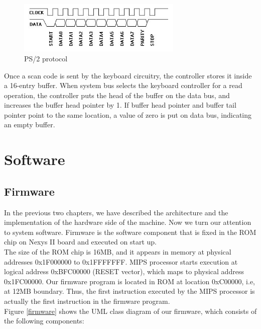 \documentclass[oneside]{book}
\begin{document}
\begin{figure}[H]
\begin{center}
\includegraphics[width=0.7\textwidth]{ps2prot.png}
\end{center}
\caption{PS/2 protocol}
\label{ps2prot}
\end{figure}

Once a scan code is sent by the keyboard circuitry, the controller stores
it inside a 16-entry buffer. When system bus selects the keyboard controller
for a read operation, the controller puts the head of the buffer on
the data bus, and increases the buffer head pointer by 1. If buffer head
pointer and buffer tail pointer point to the same location, a value
of zero is put on data bus, indicating an empty buffer.


\chapter{Software}

\section{Firmware}

In the previous two chapters, we have described the architecture and the
implementation of the hardware side of the machine. Now we turn our
attention to system software. Firmware is the software component that
is fixed in the ROM chip on Nexys II board and executed on start up.\\

The size of the ROM chip is 16MB, and it appears in memory at physical
addresses 0x1F000000 to 0x1FFFFFFF. MIPS processor starts execution
at logical address 0xBFC00000 (RESET vector), which maps to physical
address 0x1FC00000. Our firmware program is located in ROM at
location 0xC00000, i.e, at 12MB boundary. Thus, the first instruction executed
by the MIPS processor is actually the first instruction in the firmware
program.\\

Figure \ref{firmware} shows the UML class diagram of our firmware, which
consists of the following components:
\end{document}
